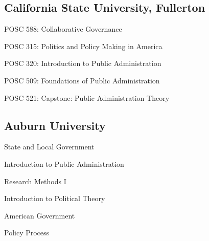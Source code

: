 \documentclass[12pt,letterpaper]{article}
\renewenvironment{itemize}{
  \begin{list}{}{
    \setlength{\leftmargin}{1.5em}
    \setlength{\itemsep}{0.25em}
    \setlength{\parskip}{0pt}
    \setlength{\parsep}{0.25em}
  }
}{
  \end{list}
}
\begin{document}
\subsection*{California State University, Fullerton}
\begin{itemize}\leftmargin=2pt\itemindent=-15pt
  \item POSC 588: Collaborative Governance
  \item POSC 315: Politics and Policy Making in America
  \item POSC 320: Introduction to Public Administration
  \item POSC 509: Foundations of Public Administration
  \item POSC 521: Capstone: Public Administration Theory
\end{itemize}

\subsection*{Auburn University}
\begin{itemize}\leftmargin=2pt\itemindent=-15pt
  \item State and Local Government
  \item Introduction to Public Administration
  \item Research Methods I
  \item Introduction to Political Theory
  \item American Government
  \item Policy Process
\end{itemize}
\end{document}
